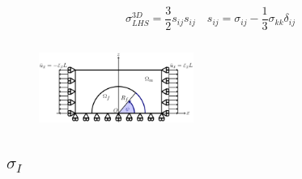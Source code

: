 \documentclass[first,firstsupp,lastsupp,last,hyperref,table]{ETHclass}
\begin{document}
\begin{frame}
\begin{columns}[c]
\begin{column}{0.5\textwidth}
\begin{figure}
\end{figure}
\scriptsize
\begin{equation*}
\sigma^{3D}_{LHS}=\frac{3}{2}s_{ij}s_{ij}\quad s_{ij}=\sigma_{ij}-\frac{1}{3}\sigma_{kk}\delta_{ij}
\end{equation*}
\end{column}
\end{columns}
\vspace{-0.3cm}
\centering
\begin{figure}
\centering
\includegraphics[width=0.45\textwidth]{refAngle.pdf}
\end{figure}
\end{frame}

\subsection{$\sigma_{I}$}
\end{document}
